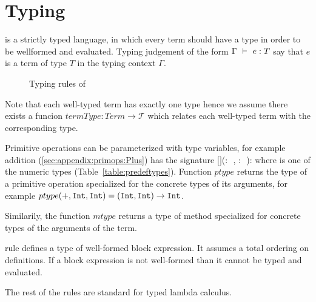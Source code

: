\section{Typing}
\label{sec:typing}

\langname is a strictly typed language, in which every term should have a
type in order to be wellformed and evaluated. Typing judgement of the form
$\Gamma~\vdash~e : T$ say that $e$ is a term of type $T$ in the typing
context $\Gamma$.

\begin{figure}[h]

\caption{Typing rules of \langname}
\label{fig:typing}
\end{figure}

Note that each well-typed term has exactly one type hence we assume there
exists a funcion $termType: Term \to \mathcal{T}$ which relates each well-typed
term with the corresponding type.

Primitive operations can be parameterized with type variables, for example
addition (\ref{sec:appendix:primops:Plus}) has the signature $[$$]$($:$~, $:$~): 
where  is one of the numeric types (Table~\ref{table:predeftypes}). 
Function $ptype$ returns the type of a primitive operation specialized for the concrete
types of its arguments, for example
$ptype(+,\lst{Int}, \lst{Int}) = (\lst{Int}, \lst{Int}) \to \lst{Int}$.

Similarily, the function $mtype$ returns a type of method specialized for concrete types of the arguments of the  term.

 rule defines a type of well-formed block expression. It
assumes a total ordering on  definitions. If a block expression is
not well-formed than it cannot be typed and evaluated.

The rest of the rules are standard for typed lambda calculus.